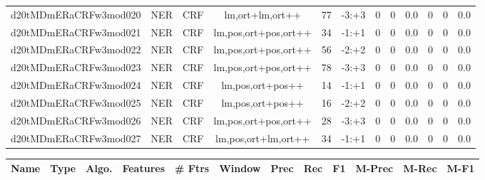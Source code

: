 \documentclass[a4paper]{article}
\begin{document}
\begin{landscape}
\begin{center}
\begin{tabular}{ |c|c|c|c|c|c|c|c|c|c|c|c|}
 
 	
 	\small{ d20tMDmERaCRFw3mod020 } & \small{ NER} & \small{  CRF }  & lm,ort+lm,ort++  &  77 &  \small{  -3:+3 }  &  0 & 0 & 0.0  &  0 & 0 & 0.0 \\
 	

 
 	
 	\small{ d20tMDmERaCRFw3mod021 } & \small{ NER} & \small{  CRF }  & lm,pos,ort+pos,ort++  &  34 &  \small{  -1:+1 }  &  0 & 0 & 0.0  &  0 & 0 & 0.0 \\
 	

 
 	
 	\small{ d20tMDmERaCRFw3mod022 } & \small{ NER} & \small{  CRF }  & lm,pos,ort+pos,ort++  &  56 &  \small{  -2:+2 }  &  0 & 0 & 0.0  &  0 & 0 & 0.0 \\
 	

 
 	
 	\small{ d20tMDmERaCRFw3mod023 } & \small{ NER} & \small{  CRF }  & lm,pos,ort+pos,ort++  &  78 &  \small{  -3:+3 }  &  0 & 0 & 0.0  &  0 & 0 & 0.0 \\
 	

 
 	
 	\small{ d20tMDmERaCRFw3mod024 } & \small{ NER} & \small{  CRF }  & lm,pos,ort+pos++  &  14 &  \small{  -1:+1 }  &  0 & 0 & 0.0  &  0 & 0 & 0.0 \\
 	

 
 	
 	\small{ d20tMDmERaCRFw3mod025 } & \small{ NER} & \small{  CRF }  & lm,pos,ort+pos++  &  16 &  \small{  -2:+2 }  &  0 & 0 & 0.0  &  0 & 0 & 0.0 \\
 	

 
 	
 	\small{ d20tMDmERaCRFw3mod026 } & \small{ NER} & \small{  CRF }  & lm,pos,ort+pos,ort++  &  28 &  \small{  -3:+3 }  &  0 & 0 & 0.0  &  0 & 0 & 0.0 \\
 	

 
 	
 	\small{ d20tMDmERaCRFw3mod027 } & \small{ NER} & \small{  CRF }  & lm,pos,ort+lm,ort++  &  34 &  \small{  -1:+1 }  &  0 & 0 & 0.0  &  0 & 0 & 0.0 \\
 	
 \hline
\end{tabular}
\end{center}




\begin{center}
\begin{tabular}{ |c|c|c|c|c|c|c|c|c|c|c|c|} 
 \hline
 	Name & Type & Algo. & Features & \# Ftrs & Window & Prec & Rec & F1 & M-Prec & M-Rec & M-F1\\
 \hline


\end{tabular}
\end{center}
\end{landscape}
\end{document}
